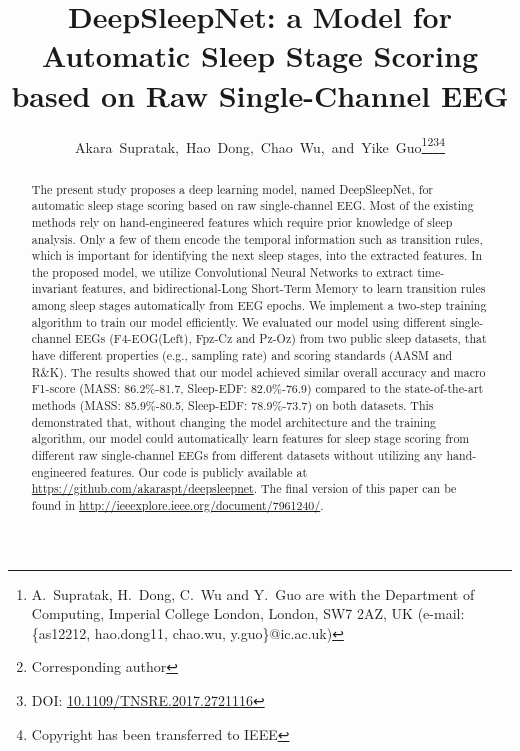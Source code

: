 \documentclass[journal,twoside]{IEEEtran}
\begin{document}
\title{DeepSleepNet: a Model for Automatic Sleep Stage Scoring based on Raw Single-Channel EEG}


\author{
Akara~Supratak,~Hao~Dong,~Chao~Wu,~and~Yike~Guo\text{*}\thanks{A.~Supratak, H.~Dong, C.~Wu and Y.~Guo are with the Department of Computing, Imperial College London, London, SW7 2AZ, UK (e-mail: \{as12212, hao.dong11, chao.wu, y.guo\}@ic.ac.uk)}\thanks{\text{*} Corresponding author}\thanks{DOI: \href{http://ieeexplore.ieee.org/document/7961240/}{10.1109/TNSRE.2017.2721116}}\thanks{Copyright has been transferred to IEEE}}



















\maketitle

\begin{abstract}
The present study proposes a deep learning model, named DeepSleepNet, for automatic sleep stage scoring based on raw single-channel EEG. Most of the existing methods rely on hand-engineered features which require prior knowledge of sleep analysis. Only a few of them encode the temporal information such as transition rules, which is important for identifying the next sleep stages, into the extracted features. In the proposed model, we utilize Convolutional Neural Networks to extract time-invariant features, and bidirectional-Long Short-Term Memory to learn transition rules among sleep stages automatically from EEG epochs.
We implement a two-step training algorithm to train our model efficiently.
We evaluated our model using different single-channel EEGs (F4-EOG(Left), Fpz-Cz and Pz-Oz) from two public sleep datasets, that have different properties (e.g., sampling rate) and scoring standards (AASM and R\&K). The results showed that our model achieved similar overall accuracy and macro F1-score (MASS: 86.2\%-81.7, Sleep-EDF: 82.0\%-76.9) compared to the state-of-the-art methods (MASS: 85.9\%-80.5, Sleep-EDF: 78.9\%-73.7) on both datasets. This demonstrated that, without changing the model architecture and the training algorithm, our model could automatically learn features for sleep stage scoring from different raw single-channel EEGs from different datasets without utilizing any hand-engineered features. Our code is publicly available at \url{https://github.com/akaraspt/deepsleepnet}. The final version of this paper can be found in \url{http://ieeexplore.ieee.org/document/7961240/}.
\end{abstract}
\end{document}
